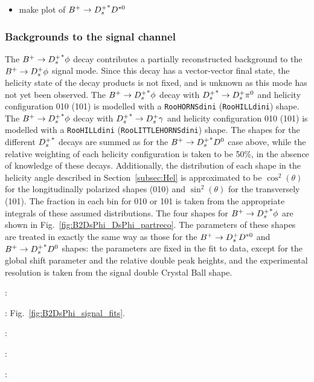 {\color{Red}
\begin{itemize}
\item make plot of ${B}^+ \rightarrow {\ensuremath{{D}^+_{s}}}^{*} D^{*0}$
\end{itemize}
}

\subsubsection{Backgrounds to the signal channel}
{\color{Blue}


\begin{description}
\item The ${B}^+ \rightarrow {\ensuremath{{D}^+_{s}}}^{*} \phi$ decay contributes a partially reconstructed background to the ${{B}^+} \rightarrow {\ensuremath{{D}^+_{s}}} \phi$ signal mode.
Since this decay has a vector-vector final state, the helicity state of the decay products is not fixed, and is unknown as this mode has not yet been observed.
The ${B}^+ \rightarrow {\ensuremath{{D}^+_{s}}}^{*} \phi$ decay with ${{D}^+_{s}}^{*} \rightarrow {\ensuremath{{D}^+_{s}}} \pi^0$ and helicity configuration 010 (101) is modelled with a \texttt{RooHORNSdini} (\texttt{RooHILLdini}) shape.
The ${B}^+ \rightarrow {\ensuremath{{D}^+_{s}}}^{*} \phi$ decay with ${{D}^+_{s}}^{*} \rightarrow {\ensuremath{{D}^+_{s}}} \gamma$ and helicity configuration 010 (101) is modelled with a \texttt{RooHILLdini} (\texttt{RooLITTLEHORNSdini}) shape.
The shapes for the different ${{D}^+_{s}}^{*}$ decays are summed as for the ${B}^+ \rightarrow {\ensuremath{{D}^+_{s}}}^{*} D^{0}$ case above, while the relative weighting of each helicity configuration is taken 
to be 50\%, in the absence of knowledge of these decays. Additionally, the distribution of each shape in the helicity angle described in Section~\ref{subsec:Hel} is approximated to be $\cos^2(\theta)$ for the longitudinally polarized shapes (010) and $\sin^2(\theta)$ for the transversely (101). The fraction in each bin for 010 or 101 is taken from the appropriate integrals of these assumed distributions. 
The four shapes for ${B}^+ \rightarrow {\ensuremath{{D}^+_{s}}}^{*} \phi$ are shown in Fig.~\ref{fig:B2DsPhi_DsPhi_partreco}.
The parameters of these shapes are treated in exactly the same way as those for the ${B}^+ \rightarrow {\ensuremath{{D}^+_{s}}} D^{*0}$ and ${B}^+ \rightarrow {\ensuremath{{D}^+_{s}}}^{*} D^{0}$ shapes: the parameters are fixed in the fit to data, except for the global shift parameter and the relative double peak heights, and the experimental resolution is taken from the signal double Crystal Ball shape.

\item \decay{\Bsb}{\Dsp\Km\Kstarz}: 
\item \decay{\Bsb}{\Dssp\Km\Kstarz}: Fig.~\ref{fig:B2DsPhi_signal_fits}.
\item \decay{\Bsb}{\Dsp\Dsm}: 
\item \decay{\Bzb}{\Dsp\Dm}: 
\item \decay{\Bsb}{\Dssp\Dsm}: 
\end{description}
}


